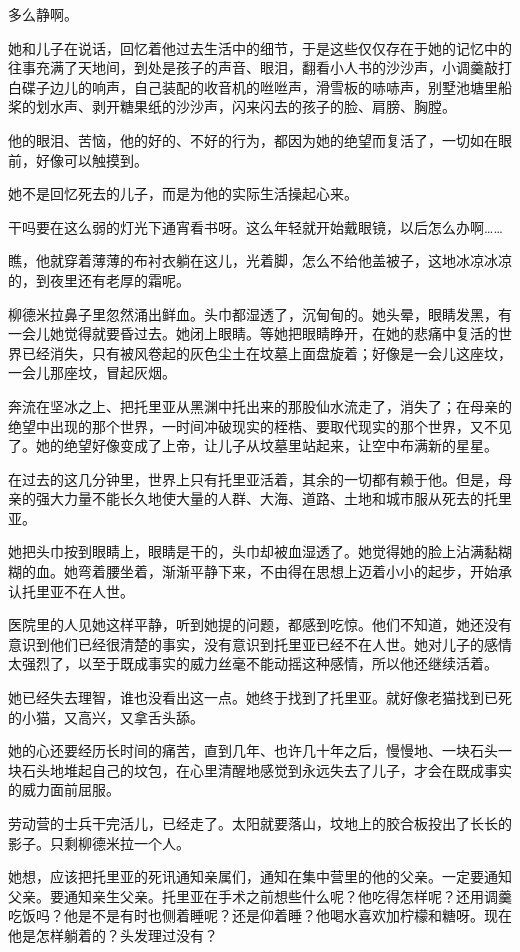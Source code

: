 多么静啊。

她和儿子在说话，回忆着他过去生活中的细节，于是这些仅仅存在于她的记忆中的往事充满了天地间，到处是孩子的声音、眼泪，翻看小人书的沙沙声，小调羹敲打白碟子边儿的响声，自己装配的收音机的咝咝声，滑雪板的哧哧声，别墅池塘里船桨的划水声、剥开糖果纸的沙沙声，闪来闪去的孩子的脸、肩膀、胸膛。

他的眼泪、苦恼，他的好的、不好的行为，都因为她的绝望而复活了，一切如在眼前，好像可以触摸到。

她不是回忆死去的儿子，而是为他的实际生活操起心来。

干吗要在这么弱的灯光下通宵看书呀。这么年轻就开始戴眼镜，以后怎么办啊……

瞧，他就穿着薄薄的布衬衣躺在这儿，光着脚，怎么不给他盖被子，这地冰凉冰凉的，到夜里还有老厚的霜呢。

柳德米拉鼻子里忽然涌出鲜血。头巾都湿透了，沉甸甸的。她头晕，眼睛发黑，有一会儿她觉得就要昏过去。她闭上眼睛。等她把眼睛睁开，在她的悲痛中复活的世界已经消失，只有被风卷起的灰色尘土在坟墓上面盘旋着；好像是一会儿这座坟，一会儿那座坟，冒起灰烟。

奔流在坚冰之上、把托里亚从黑渊中托出来的那股仙水流走了，消失了；在母亲的绝望中出现的那个世界，一时间冲破现实的桎梏、要取代现实的那个世界，又不见了。她的绝望好像变成了上帝，让儿子从坟墓里站起来，让空中布满新的星星。

在过去的这几分钟里，世界上只有托里亚活着，其余的一切都有赖于他。但是，母亲的强大力量不能长久地使大量的人群、大海、道路、土地和城市服从死去的托里亚。

她把头巾按到眼睛上，眼睛是干的，头巾却被血湿透了。她觉得她的脸上沾满黏糊糊的血。她弯着腰坐着，渐渐平静下来，不由得在思想上迈着小小的起步，开始承认托里亚不在人世。

医院里的人见她这样平静，听到她提的问题，都感到吃惊。他们不知道，她还没有意识到他们已经很清楚的事实，没有意识到托里亚已经不在人世。她对儿子的感情太强烈了，以至于既成事实的威力丝毫不能动摇这种感情，所以他还继续活着。

她已经失去理智，谁也没看出这一点。她终于找到了托里亚。就好像老猫找到已死的小猫，又高兴，又拿舌头舔。

她的心还要经历长时间的痛苦，直到几年、也许几十年之后，慢慢地、一块石头一块石头地堆起自己的坟包，在心里清醒地感觉到永远失去了儿子，才会在既成事实的威力面前屈服。

劳动营的士兵干完活儿，已经走了。太阳就要落山，坟地上的胶合板投出了长长的影子。只剩柳德米拉一个人。

她想，应该把托里亚的死讯通知亲属们，通知在集中营里的他的父亲。一定要通知父亲。要通知亲生父亲。托里亚在手术之前想些什么呢？他吃得怎样呢？还用调羹吃饭吗？他是不是有时也侧着睡呢？还是仰着睡？他喝水喜欢加柠檬和糖呀。现在他是怎样躺着的？头发理过没有？

